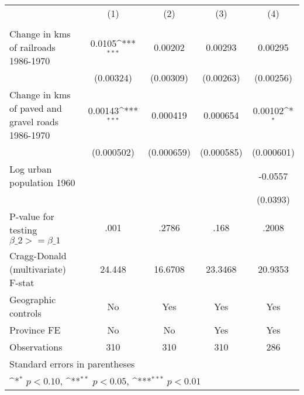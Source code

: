 {
\def\sym#1{\ifmmode^{#1}\else\(^{#1}\)\fi}
\begin{tabular}{l*{4}{c}}
\hline\hline
                &\multicolumn{1}{c}{(1)}&\multicolumn{1}{c}{(2)}&\multicolumn{1}{c}{(3)}&\multicolumn{1}{c}{(4)}\\
                &\multicolumn{1}{c}{}&\multicolumn{1}{c}{}&\multicolumn{1}{c}{}&\multicolumn{1}{c}{}\\
\hline
Change in kms of railroads 1986-1970&   0.0105\sym{***}&  0.00202         &  0.00293         &  0.00295         \\
                &(0.00324)         &(0.00309)         &(0.00263)         &(0.00256)         \\
[1em]
Change in kms of paved and gravel roads 1986-1970&  0.00143\sym{***}& 0.000419         & 0.000654         &  0.00102\sym{*}  \\
                &(0.000502)         &(0.000659)         &(0.000585)         &(0.000601)         \\
[1em]
Log urban population 1960&                  &                  &                  &  -0.0557         \\
                &                  &                  &                  & (0.0393)         \\
\hline
P-value for testing $\beta\_{2} >= \beta\_{1}$&     .001         &    .2786         &     .168         &    .2008         \\
Cragg-Donald (multivariate) F-stat&   24.448         &  16.6708         &  23.3468         &  20.9353         \\
Geographic controls&       No         &      Yes         &      Yes         &      Yes         \\
Province FE     &       No         &       No         &      Yes         &      Yes         \\
Observations    &      310         &      310         &      310         &      286         \\
\hline\hline
\multicolumn{5}{l}{\footnotesize Standard errors in parentheses}\\
\multicolumn{5}{l}{\footnotesize \sym{*} \(p<0.10\), \sym{**} \(p<0.05\), \sym{***} \(p<0.01\)}\\
\end{tabular}
}

